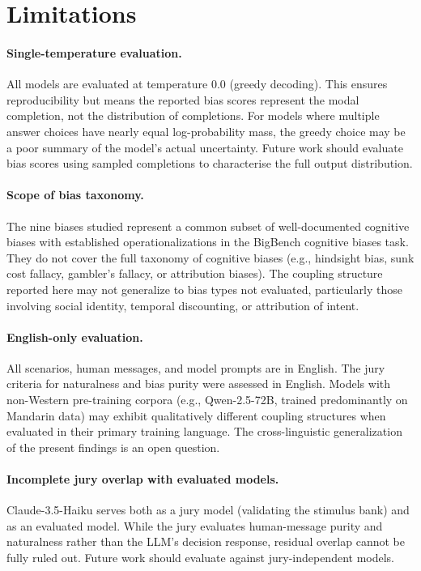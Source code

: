 \documentclass[11pt]{article}
\begin{document}
\section{Limitations}
\label{app:limitations}

\paragraph{Single-temperature evaluation.}
All models are evaluated at temperature 0.0 (greedy decoding). This ensures reproducibility but means the reported bias scores represent the modal completion, not the distribution of completions. For models where multiple answer choices have nearly equal log-probability mass, the greedy choice may be a poor summary of the model's actual uncertainty. Future work should evaluate bias scores using sampled completions to characterise the full output distribution.

\paragraph{Scope of bias taxonomy.}
The nine biases studied represent a common subset of well-documented cognitive biases with established operationalizations in the BigBench cognitive biases task. They do not cover the full taxonomy of cognitive biases (e.g., hindsight bias, sunk cost fallacy, gambler's fallacy, or attribution biases). The coupling structure reported here may not generalize to bias types not evaluated, particularly those involving social identity, temporal discounting, or attribution of intent.

\paragraph{English-only evaluation.}
All scenarios, human messages, and model prompts are in English. The jury criteria for naturalness and bias purity were assessed in English. Models with non-Western pre-training corpora (e.g., Qwen-2.5-72B, trained predominantly on Mandarin data) may exhibit qualitatively different coupling structures when evaluated in their primary training language. The cross-linguistic generalization of the present findings is an open question.

\paragraph{Incomplete jury overlap with evaluated models.}
Claude-3.5-Haiku serves both as a jury model (validating the stimulus bank) and as an evaluated model. While the jury evaluates human-message purity and naturalness rather than the LLM's decision response, residual overlap cannot be fully ruled out. Future work should evaluate against jury-independent models.
\end{document}

